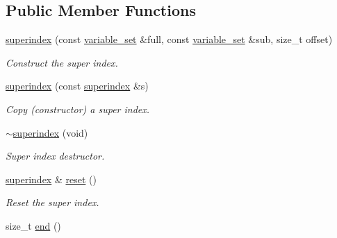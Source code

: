 \subsection*{Public Member Functions}
\begin{DoxyCompactItemize}
\item 
\hyperlink{classmerlin_1_1superindex_a9fdcd5396269adc20332a46f8e0e33e8}{superindex} (const \hyperlink{classmerlin_1_1variable__set}{variable\+\_\+set} \&full, const \hyperlink{classmerlin_1_1variable__set}{variable\+\_\+set} \&sub, size\+\_\+t offset)\hypertarget{classmerlin_1_1superindex_a9fdcd5396269adc20332a46f8e0e33e8}{}\label{classmerlin_1_1superindex_a9fdcd5396269adc20332a46f8e0e33e8}

\begin{DoxyCompactList}\small\item\em Construct the super index. \end{DoxyCompactList}\item 
\hyperlink{classmerlin_1_1superindex_a6ca2a8c735a9542940509299e5d0f4b2}{superindex} (const \hyperlink{classmerlin_1_1superindex}{superindex} \&s)\hypertarget{classmerlin_1_1superindex_a6ca2a8c735a9542940509299e5d0f4b2}{}\label{classmerlin_1_1superindex_a6ca2a8c735a9542940509299e5d0f4b2}

\begin{DoxyCompactList}\small\item\em Copy (constructor) a super index. \end{DoxyCompactList}\item 
\hyperlink{classmerlin_1_1superindex_a9b59da9851840bc5520c8eea0816a2cf}{$\sim$superindex} (void)\hypertarget{classmerlin_1_1superindex_a9b59da9851840bc5520c8eea0816a2cf}{}\label{classmerlin_1_1superindex_a9b59da9851840bc5520c8eea0816a2cf}

\begin{DoxyCompactList}\small\item\em Super index destructor. \end{DoxyCompactList}\item 
\hyperlink{classmerlin_1_1superindex}{superindex} \& \hyperlink{classmerlin_1_1superindex_ac938f63832e550b87d1aae7ca766b423}{reset} ()\hypertarget{classmerlin_1_1superindex_ac938f63832e550b87d1aae7ca766b423}{}\label{classmerlin_1_1superindex_ac938f63832e550b87d1aae7ca766b423}

\begin{DoxyCompactList}\small\item\em Reset the super index. \end{DoxyCompactList}\item 
size\+\_\+t \hyperlink{classmerlin_1_1superindex_a351aded45129c5b3737bf87d6ab860f1}{end} ()\hypertarget{classmerlin_1_1superindex_a351aded45129c5b3737bf87d6ab860f1}{}\label{classmerlin_1_1superindex_a351aded45129c5b3737bf87d6ab860f1}


\end{DoxyCompactItemize}
